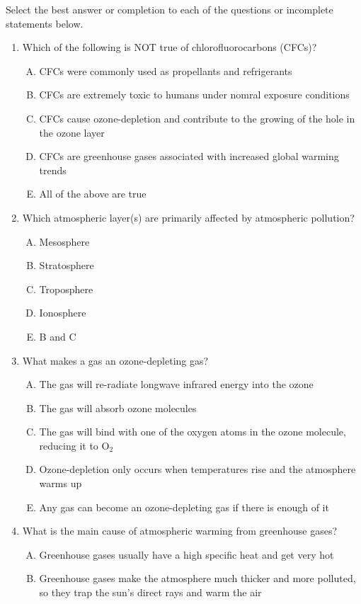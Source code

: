 \documentclass[english,twoside]{article}
\begin{document}
Select the best answer or completion to each of the questions or incomplete statements below.
\begin{enumerate}
	\item Which of the following is NOT true of chlorofluorocarbons (CFCs)? 
	\begin{enumerate}[A.]
		\item CFCs were commonly used as propellants and refrigerants 
		\item CFCs are extremely toxic to humans under nomral exposure conditions
		\item CFCs cause ozone-depletion and contribute to the growing of the hole in the ozone layer	
		\item CFCs are greenhouse gases associated with increased global warming trends
		\item All of the above are true
	\end{enumerate}
	\item Which atmospheric layer(s) are primarily affected by atmospheric pollution? 
	\begin{enumerate}[A.]
		\item Mesosphere
		\item Stratosphere
		\item Troposphere
		\item Ionosphere
		\item B and C
	\end{enumerate}
	\item What makes a gas an ozone-depleting gas?
	\begin{enumerate}[A.]
		\item The gas will re-radiate longwave infrared energy into the ozone
		\item The gas will absorb ozone molecules
		\item The gas will bind with one of the oxygen atoms in the ozone molecule, reducing it to O$_2$
		\item Ozone-depletion only occurs when temperatures rise and the atmosphere warms up
		\item Any gas can become an ozone-depleting gas if there is enough of it
	\end{enumerate}
	\item What is the main cause of atmospheric warming from greenhouse gases?
	\begin{enumerate}[A.]
		\item Greenhouse gases usually have a high specific heat and get very hot
		\item Greenhouse gases make the atmosphere much thicker and more polluted, so they trap the sun's direct rays and warm the air

\end{enumerate}
\end{enumerate}
\end{document}
